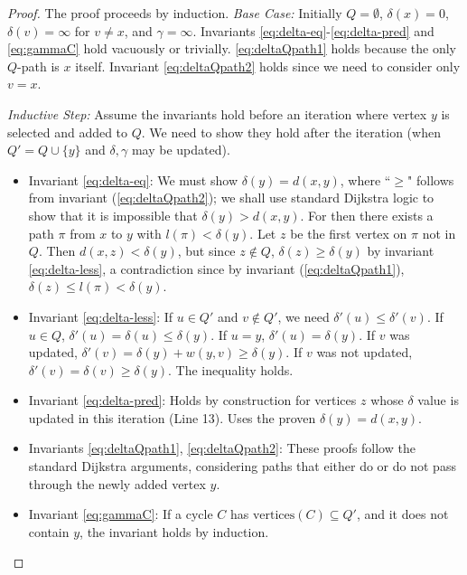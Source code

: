 \documentclass{article}
\newcommand{\ta}[1]{\textcolor{blue}{\textit{(TA: {#1})}}}
\begin{document}
\begin{proof} The proof proceeds by induction.
\textit{Base Case:} Initially $Q = \emptyset$, $\delta(x)=0$, $\delta(v)=\infty$ for $v \neq x$, and $\gamma = \infty$. Invariants \eqref{eq:delta-eq}-\eqref{eq:delta-pred} and \eqref{eq:gammaC} hold vacuously or trivially. \eqref{eq:deltaQpath1} holds because the only $Q$-path is $x$ itself. Invariant \eqref{eq:deltaQpath2} holds since we need to consider only $v=x$.

\textit{Inductive Step:} Assume the invariants hold before an iteration where vertex $y$ is selected and added to $Q$. We need to show they hold after the iteration (when $Q' = Q \cup \{y\}$ and $\delta, \gamma$ may be updated).
\begin{itemize}
    \item Invariant \eqref{eq:delta-eq}: We must show $\delta(y) = d(x,y)$, where ``$\ge$" follows from invariant (\ref{eq:deltaQpath2}); we shall use standard Dijkstra logic to show that it is impossible that $\delta(y) > d(x,y)$. For then there exists a path $\pi$ from $x$ to $y$ with $l(\pi) < \delta(y)$. Let $z$ be the first vertex on $\pi$ not in $Q$. Then $d(x,z) < \delta(y)$, but since $z \notin Q$, $\delta(z) \ge \delta(y)$ by invariant \eqref{eq:delta-less}, a contradiction since by invariant (\ref{eq:deltaQpath1}), $\delta(z) \le l(\pi) < \delta(y)$.
    \item Invariant \eqref{eq:delta-less}: If $u \in Q'$ and $v \notin Q'$, we need $\delta'(u) \le \delta'(v)$. If $u \in Q$, $\delta'(u)=\delta(u) \le \delta(y)$. If $u=y$, $\delta'(u)=\delta(y)$. If $v$ was updated, $\delta'(v) = \delta(y) + w(y,v) \ge \delta(y)$. If $v$ was not updated, $\delta'(v)=\delta(v) \ge \delta(y)$. The inequality holds.
    \item Invariant \eqref{eq:delta-pred}: Holds by construction for vertices $z$ whose $\delta$ value is updated in this iteration (Line 13). Uses the proven $\delta(y)=d(x,y)$.
    \item Invariants \eqref{eq:deltaQpath1}, \eqref{eq:deltaQpath2}: These proofs follow the standard Dijkstra arguments, considering paths that either do or do not pass through the newly added vertex $y$.
    \item Invariant \eqref{eq:gammaC}: If a cycle $C$ has $\text{vertices}(C) \subseteq Q'$, and it does not contain $y$, the invariant holds by induction. %

\end{itemize}
\end{proof}
\end{document}
